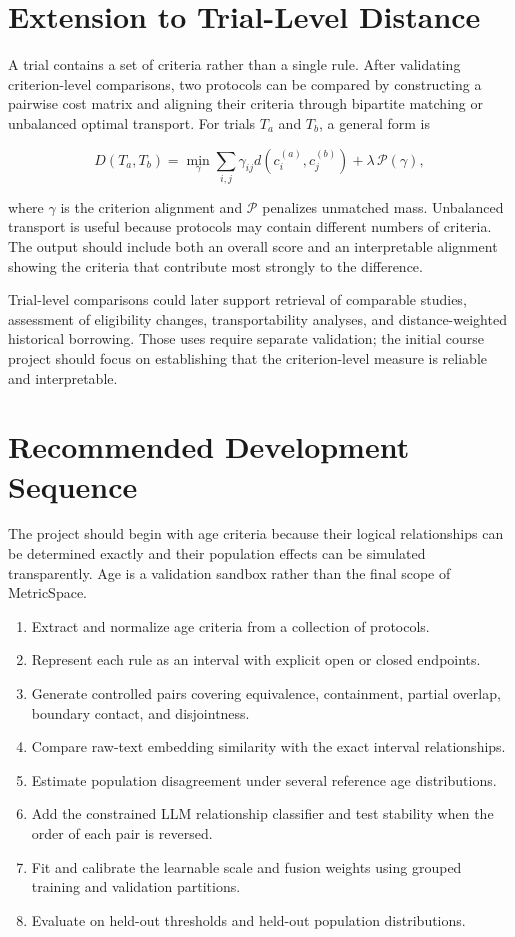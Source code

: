 \documentclass[11pt]{article}
\begin{document}
\section{Extension to Trial-Level Distance}

A trial contains a set of criteria rather than a single rule. After validating criterion-level comparisons, two protocols can be compared by constructing a pairwise cost matrix and aligning their criteria through bipartite matching or unbalanced optimal transport. For trials $T_a$ and $T_b$, a general form is

\[
D(T_a,T_b)
=\min_{\gamma}\sum_{i,j}\gamma_{ij}
d\!\left(c_i^{(a)},c_j^{(b)}\right)
+\lambda\,\mathcal{P}(\gamma),
\]

where $\gamma$ is the criterion alignment and $\mathcal{P}$ penalizes unmatched mass. Unbalanced transport is useful because protocols may contain different numbers of criteria. The output should include both an overall score and an interpretable alignment showing the criteria that contribute most strongly to the difference.

Trial-level comparisons could later support retrieval of comparable studies, assessment of eligibility changes, transportability analyses, and distance-weighted historical borrowing. Those uses require separate validation; the initial course project should focus on establishing that the criterion-level measure is reliable and interpretable.

\section{Recommended Development Sequence}

The project should begin with age criteria because their logical relationships can be determined exactly and their population effects can be simulated transparently. Age is a validation sandbox rather than the final scope of MetricSpace.

\begin{enumerate}
    \item Extract and normalize age criteria from a collection of protocols.
    \item Represent each rule as an interval with explicit open or closed endpoints.
    \item Generate controlled pairs covering equivalence, containment, partial overlap, boundary contact, and disjointness.
    \item Compare raw-text embedding similarity with the exact interval relationships.
    \item Estimate population disagreement under several reference age distributions.
    \item Add the constrained LLM relationship classifier and test stability when the order of each pair is reversed.
    \item Fit and calibrate the learnable scale and fusion weights using grouped training and validation partitions.
    \item Evaluate on held-out thresholds and held-out population distributions.
\end{enumerate}
\end{document}
